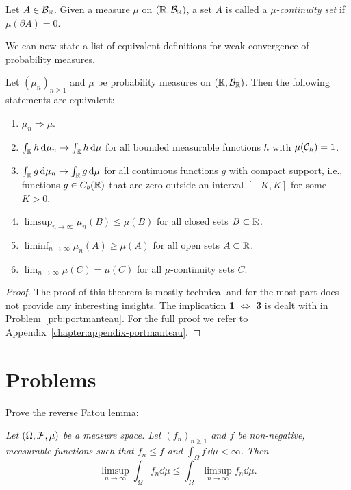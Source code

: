 \begin{definition}
	Let $A\in\mathcal B_{\mathbb R}$. Given a measure $\mu$ on $(\mathbb R, \mathcal B_{\mathbb R})$, a set $A$ is called a \emph{$\mu$-continuity set} if $\mu(\partial A) = 0$.
\end{definition}

We can now state a list of equivalent definitions for weak convergence of probability measures.

\begin{theorem}\label{thm:portmanteau}
Let $(\mu_n)_{n \ge 1}$ and $\mu$ be probability measures on $(\mathbb R, \mathcal B_{\mathbb R})$. Then the following statements are equivalent:
\begin{enumerate}[label={(\arabic*)}]
\item $\mu_n \Rightarrow \mu$.
\item $\int_{\mathbb R} h \, \mathrm{d} \mu_n \to \int_{\mathbb R} h \, \mathrm{d} \mu$ for all bounded measurable functions $h$ with $\mu(\mathcal C_h) = 1$.
\item $\int_{\mathbb R} g \, \mathrm{d} \mu_n \to \int_{\mathbb R} g \, \mathrm{d} \mu$ for all continuous functions $g$ with compact support, i.e., functions $g\in C_b(\mathbb R)$ that are zero outside an interval $[-K,K]$ for some $K > 0$.
\item $\limsup_{n \to \infty} \mu_n(B) \le \mu(B)$ for all closed sets $B \subset \mathbb R$.
\item $\liminf_{n \to \infty} \mu_n(A) \ge \mu(A)$ for all open sets $A \subset \mathbb R$.
\item $\lim_{n \to \infty} \mu(C) = \mu(C)$ for all $\mu$-continuity sets $C$.
\end{enumerate}
\end{theorem} 

\begin{proof}
The proof of this theorem is mostly technical and for the most part does not provide any interesting insights. The implication \textbf{1} $\iff$ \textbf{3} is dealt with in Problem~\ref{prb:portmanteau}. For the full proof we refer to Appendix~\ref{chapter:appendix-portmanteau}. 
\end{proof}

\section{Problems}

\begin{problem}\label{prb:reverse_fatou}
Prove the reverse Fatou lemma:

\smallskip
\textit{
Let $(\Omega, \mathcal F, \mu)$ be a measure space. Let $(f_n)_{n \ge 1}$ and $f$ be non-negative, measurable functions such that $f_n \le f$ and $\int_\Omega f \, \dd \mu <\infty$. Then
\[
	\limsup_{n\to \infty} \int_\Omega f_n \dd \mu \le \int_\Omega \limsup_{n\to \infty} f_n \dd \mu.
\]
}
\end{problem}

